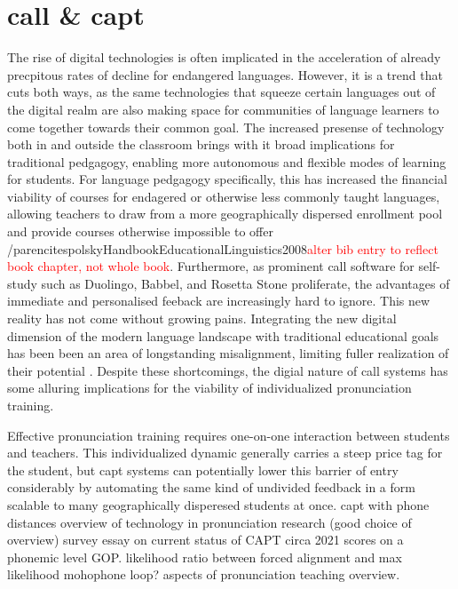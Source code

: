\documentclass[thesis]{cluu}
\newcommand{\todo}[1]{\textcolor{red}{#1}}
\begin{document}
\section{\gls{call} \& \gls{capt}}
The rise of digital technologies is often implicated in the acceleration of already precpitous rates of decline for endangered languages. However, it is a trend that cuts both ways, as the same technologies that squeeze certain languages out of the digital realm are also making space for communities of language learners to come together towards their common goal. The increased presense of technology both in and outside the classroom brings with it broad implications for traditional pedgagogy, enabling more autonomous and flexible modes of learning for students. For language pedgagogy specifically, this has increased the financial viability of courses for endagered or otherwise less commonly taught languages, allowing teachers to draw from a more geographically dispersed enrollment pool and provide courses otherwise impossible to offer /parencite{spolskyHandbookEducationalLinguistics2008}\todo{alter bib entry to reflect book chapter, not whole book}. Furthermore, as prominent \gls{call} software for self-study such as Duolingo, Babbel, and Rosetta Stone proliferate, the advantages of immediate and personalised feeback are increasingly hard to ignore. This new reality has not come without growing pains. Integrating the new digital dimension of the modern language landscape with traditional educational goals has been been an area of longstanding misalignment, limiting fuller realization of their potential \parencite{bajorek2017l2}. Despite these shortcomings, the digial nature of \gls{call} systems has some alluring implications for the viability of individualized pronunciation training.

Effective pronunciation training requires one-on-one interaction between students and teachers. This individualized dynamic generally carries a steep price tag for the student, but \gls{capt} systems can potentially lower this barrier of entry considerably by automating the same kind of undivided feedback in a form scalable to many geographically disperesed students at once.
\textcite{kyriakopoulosDeepLearningApproach2018} capt with phone distances
\textcite{levisCOMPUTERTECHNOLOGYTEACHING2007} overview of technology in pronunciation research (good choice of overview)
\textcite{rogerson-revellComputerAssistedPronunciationTraining2021} survey essay on current status of CAPT circa 2021
\textcite{witt2014computer} scores on a phonemic level GOP. likelihood ratio between forced alignment and max likelihood mohophone loop? aspects of pronunciation teaching overview.
\end{document}
